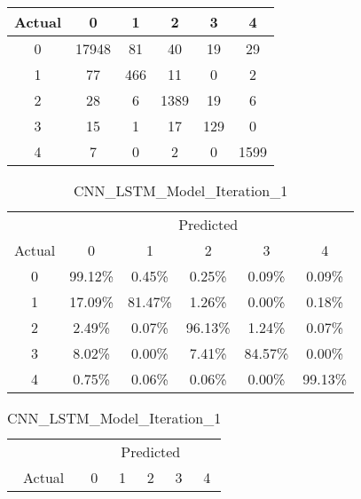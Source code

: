 \begin{table}[ht]
\begin{minipage}{0.32\textwidth}
\begin{tabular}{cccccc}
            \cmidrule(lr){2-6}
            Actual & 0 & 1 & 2 & 3 & 4 \\
            \midrule
            0 & 17948 & 81  & 40  & 19  & 29 \\
            1 & 77    & 466 & 11  & 0   & 2  \\
            2 & 28    & 6   & 1389& 19  & 6  \\
            3 & 15    & 1   & 17  & 129 & 0  \\
            4 & 7     & 0   & 2   & 0   & 1599 \\
            \bottomrule
        \end{tabular}
    \end{minipage}
\end{table}

\begin{table}[ht]
    \centering
    \caption{Normalized Confusion Matrices in Percent}
    \label{tab:normalized_conf_percent}
    \begin{minipage}{0.32\textwidth}
        \centering
        \caption*{CNN\_Model\_Iteration\_1}
        \begin{tabular}{cccccc}
            \toprule
            & \multicolumn{5}{c}{Predicted} \\
            \cmidrule(lr){2-6}
            Actual & 0 & 1 & 2 & 3 & 4 \\
            \midrule
            0 & 99.12\% & 0.45\% & 0.25\% & 0.09\% & 0.09\% \\
            1 & 17.09\% & 81.47\% & 1.26\% & 0.00\% & 0.18\% \\
            2 & 2.49\%  & 0.07\% & 96.13\% & 1.24\% & 0.07\% \\
            3 & 8.02\%  & 0.00\% & 7.41\%  & 84.57\% & 0.00\% \\
            4 & 0.75\%  & 0.06\% & 0.06\%  & 0.00\% & 99.13\% \\
            \bottomrule
        \end{tabular}
    \end{minipage}
    \hfill
    \begin{minipage}{0.32\textwidth}
        \centering
        \caption*{CNN\_LSTM\_Model\_Iteration\_1}
        \begin{tabular}{cccccc}
            \toprule
            & \multicolumn{5}{c}{Predicted} \\
            \cmidrule(lr){2-6}
            Actual & 0 & 1 & 2 & 3 & 4 \\

\end{tabular}
\end{minipage}
\end{table}
